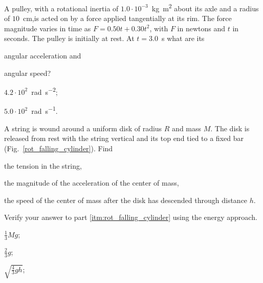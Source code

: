 \begin{problem}
	A pulley, with a rotational inertia of $1.0 \cdot 10^{-3}$~\si{\kilo\gram\square\meter} about its axle and a radius of $10$~cm,is acted on by a force applied tangentially at its rim. The force magnitude varies in time as $F = 0.50 t + 0.30 t^2$, with $F$ in newtons and $t$ in seconds. The pulley is initially at rest. At $t = 3.0$~s what are its 
	\begin{enumerate*}[label=(\alph*)]
		\item angular acceleration and
		\item angular speed?
	\end{enumerate*}
	\begin{solution}
		\begin{enumerate*}[label=(\alph*)]
			\item $4.2 \cdot 10^2$~\si{\radian\per\square\second};
			\item $5.0 \cdot  10^2$~\si{\radian\per\second}.
		\end{enumerate*}
	\end{solution}
\end{problem}


\begin{problem}\label{prb:rot_falling_cylinder}
	A string is wound around a uniform disk of radius $R$ and mass $M$. The disk is released from rest with the string vertical and its top end tied to a fixed bar (Fig.~\ref{rot_falling_cylinder}). Find
	\begin{enumerate*}[label=(\alph*)]
		\item the tension in the string,
		\item the magnitude of the acceleration of the center of mass,
		\item \label{itm:rot_falling_cylinder}the speed of the center of mass after the disk has descended through distance $h$.
	\end{enumerate*}
	Verify your answer to part \ref{itm:rot_falling_cylinder} using the energy approach.
	\begin{solution}
		\begin{enumerate*}[label=(\alph*)]
			\item $\frac13Mg$;
			\item $\frac23 g$;
			\item $\sqrt{\frac43 gh}$;
		\end{enumerate*}
	\end{solution}
\end{problem}


